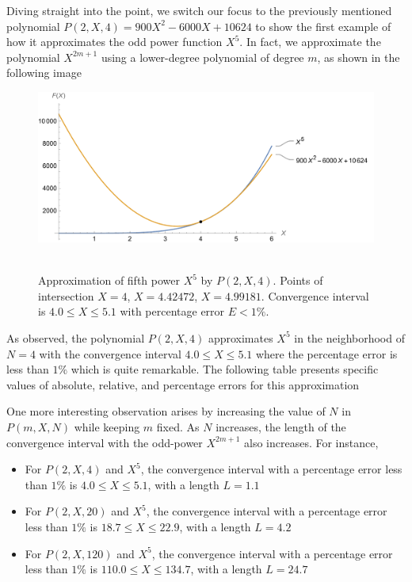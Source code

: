 Diving straight into the point, we switch our focus to the previously mentioned polynomial
$P(2,X,4) = 900X^2 - 6000X + 10624$
to show the first example of how it approximates the odd power function $X^5$.
In fact, we approximate the polynomial $X^{2m+1}$ using a lower-degree polynomial of degree $m$,
as shown in the following image
\begin{figure}[H]
    \centering
    \includegraphics[width=1\textwidth]{sections/images/03_plots_polynomial_p2_n4_with_fifth}
    ~\caption{Approximation of fifth power $X^5$ by $P(2, X, 4)$.
    Points of intersection $X=4$, $X=4.42472$, $X=4.99181$.
    Convergence interval is $4.0 \leq X \leq 5.1$ with percentage error $E < 1\%$.
    }\label{fig:03_plots_polynomial_p2_n4_with_fifth}
\end{figure}
As observed, the polynomial $P(2, X, 4)$ approximates $X^5$ in the neighborhood of $N=4$ with
the convergence interval $4.0 \leq X \leq 5.1$ where the percentage error is less than $1\%$ which is quite remarkable.
The following table presents specific values of absolute, relative, and percentage errors for this approximation


One more interesting observation arises by increasing the value of $N$ in $P(m, X, N)$ while keeping $m$ fixed.
As $N$ increases, the length of the convergence interval with the odd-power $X^{2m+1}$ also increases.
For instance,
\begin{itemize}
    \item For $P(2, X, 4)$ and $X^5$, the convergence interval with a percentage error less than $1\%$ is $4.0 \leq X \leq 5.1$, with a length $L=1.1$
    \item For $P(2, X, 20)$ and $X^5$, the convergence interval with a percentage error less than $1\%$ is $18.7 \leq X \leq 22.9$, with a length $L=4.2$
    \item For $P(2, X, 120)$ and $X^5$, the convergence interval with a percentage error less than $1\%$ is $110.0 \leq X \leq 134.7$, with a length $L=24.7$
\end{itemize}

